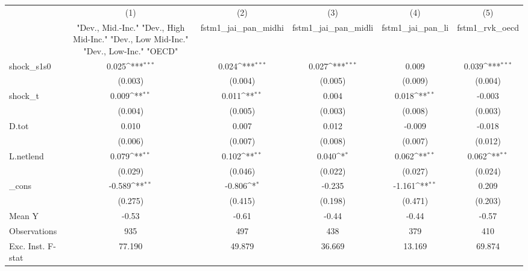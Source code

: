 {
\def\sym#1{\ifmmode^{#1}\else\(^{#1}\)\fi}
\begin{tabular}{l*{5}{c}}
\toprule
            &\multicolumn{1}{c}{(1)}&\multicolumn{1}{c}{(2)}&\multicolumn{1}{c}{(3)}&\multicolumn{1}{c}{(4)}&\multicolumn{1}{c}{(5)}\\
            &\multicolumn{1}{c}{ "Dev., Mid.-Inc." "Dev., High Mid-Inc." "Dev., Low Mid-Inc." "Dev., Low-Inc." "OECD" }&\multicolumn{1}{c}{fstm1\_jai\_pan\_midhi}&\multicolumn{1}{c}{fstm1\_jai\_pan\_midli}&\multicolumn{1}{c}{fstm1\_jai\_pan\_li}&\multicolumn{1}{c}{fstm1\_rvk\_oecd}\\
\midrule
shock\_s1s0  &       0.025\sym{***}&       0.024\sym{***}&       0.027\sym{***}&       0.009         &       0.039\sym{***}\\
            &     (0.003)         &     (0.004)         &     (0.005)         &     (0.009)         &     (0.004)         \\
\addlinespace
shock\_t     &       0.009\sym{**} &       0.011\sym{**} &       0.004         &       0.018\sym{**} &      -0.003         \\
            &     (0.004)         &     (0.005)         &     (0.003)         &     (0.008)         &     (0.003)         \\
\addlinespace
D.tot       &       0.010         &       0.007         &       0.012         &      -0.009         &      -0.018         \\
            &     (0.006)         &     (0.007)         &     (0.008)         &     (0.007)         &     (0.012)         \\
\addlinespace
L.netlend   &       0.079\sym{**} &       0.102\sym{**} &       0.040\sym{*}  &       0.062\sym{**} &       0.062\sym{**} \\
            &     (0.029)         &     (0.046)         &     (0.022)         &     (0.027)         &     (0.024)         \\
\addlinespace
\_cons      &      -0.589\sym{**} &      -0.806\sym{*}  &      -0.235         &      -1.161\sym{**} &       0.209         \\
            &     (0.275)         &     (0.415)         &     (0.198)         &     (0.471)         &     (0.203)         \\
\midrule
Mean Y      &       -0.53         &       -0.61         &       -0.44         &       -0.44         &       -0.57         \\
Observations&         935         &         497         &         438         &         379         &         410         \\
Exc. Inst. F-stat&      77.190         &      49.879         &      36.669         &      13.169         &      69.874         \\
\bottomrule
\end{tabular}
}
